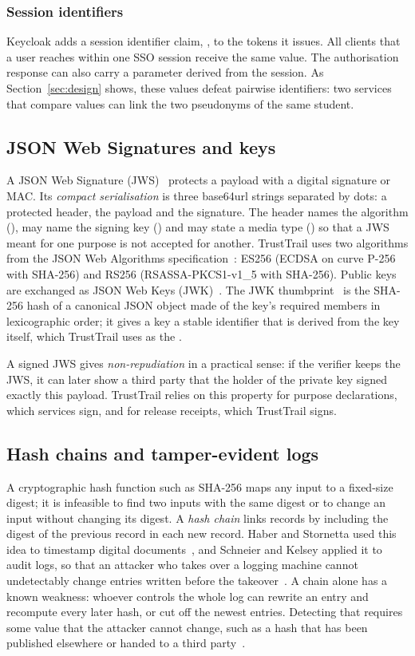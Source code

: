 \subsubsection{Session identifiers}
Keycloak adds a session identifier claim, , to the tokens it issues. All clients that a user reaches within one SSO session receive the same  value. The authorisation response can also carry a  parameter derived from the session. As Section~\ref{sec:design} shows, these values defeat pairwise identifiers: two services that compare  values can link the two pseudonyms of the same student.

\subsection{JSON Web Signatures and keys}
A JSON Web Signature (JWS)~\cite{rfc7515} protects a payload with a digital signature or MAC. Its \emph{compact serialisation} is three base64url strings separated by dots: a protected header, the payload and the signature. The header names the algorithm (), may name the signing key () and may state a media type () so that a JWS meant for one purpose is not accepted for another. TrustTrail uses two algorithms from the JSON Web Algorithms specification~\cite{rfc7518}: ES256 (ECDSA on curve P-256 with SHA-256) and RS256 (RSASSA-PKCS1-v1\_5 with SHA-256). Public keys are exchanged as JSON Web Keys (JWK)~\cite{rfc7517}. The JWK thumbprint~\cite{rfc7638} is the SHA-256 hash of a canonical JSON object made of the key's required members in lexicographic order; it gives a key a stable identifier that is derived from the key itself, which TrustTrail uses as the .

A signed JWS gives \emph{non-repudiation} in a practical sense: if the verifier keeps the JWS, it can later show a third party that the holder of the private key signed exactly this payload. TrustTrail relies on this property for purpose declarations, which services sign, and for release receipts, which TrustTrail signs.

\subsection{Hash chains and tamper-evident logs}
A cryptographic hash function such as SHA-256 maps any input to a fixed-size digest; it is infeasible to find two inputs with the same digest or to change an input without changing its digest. A \emph{hash chain} links records by including the digest of the previous record in each new record. Haber and Stornetta used this idea to timestamp digital documents~\cite{haber1991timestamp}, and Schneier and Kelsey applied it to audit logs, so that an attacker who takes over a logging machine cannot undetectably change entries written before the takeover~\cite{schneier1999secure}. A chain alone has a known weakness: whoever controls the whole log can rewrite an entry and recompute every later hash, or cut off the newest entries. Detecting that requires some value that the attacker cannot change, such as a hash that has been published elsewhere or handed to a third party~\cite{crosby2009efficient,ma2007forward}.

